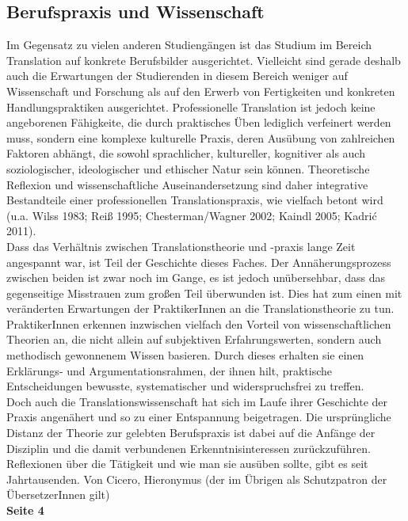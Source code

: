 \documentclass{article}
\begin{document}
	\subsection*{Berufspraxis und Wissenschaft}
	Im Gegensatz zu vielen anderen Studiengängen ist das Studium im Bereich Translation auf konkrete Berufsbilder ausgerichtet. Vielleicht sind gerade deshalb auch die Erwartungen der Studierenden in diesem Bereich weniger auf Wissenschaft und Forschung als auf den Erwerb von Fertigkeiten und konkreten Handlungspraktiken ausgerichtet. Professionelle Translation ist jedoch keine angeborenen Fähigkeite, die durch praktisches Üben lediglich verfeinert werden muss, sondern eine komplexe kulturelle Praxis, deren Ausübung von zahlreichen Faktoren abhängt, die sowohl sprachlicher, kultureller, kognitiver als auch soziologischer, ideologischer und ethischer Natur sein können. Theoretische Reflexion und wissenschaftliche Auseinandersetzung sind daher integrative Bestandteile einer professionellen Translationspraxis, wie vielfach betont wird (u.a. Wilss 1983; Reiß 1995; Chesterman/Wagner 2002; Kaindl 2005; Kadrić 2011). \\
	Dass das Verhältnis zwischen Translationstheorie und -praxis lange Zeit angespannt war, ist Teil der Geschichte dieses Faches. Der Annäherungsprozess zwischen beiden ist zwar noch im Gange, es ist jedoch unübersehbar, dass das gegenseitige Misstrauen zum großen Teil überwunden ist. Dies hat zum einen mit veränderten Erwartungen der PraktikerInnen an die Translationstheorie zu tun. PraktikerInnen erkennen inzwischen vielfach den Vorteil von wissenschaftlichen Theorien an, die nicht allein auf subjektiven Erfahrungswerten, sondern auch methodisch gewonnenem Wissen basieren. Durch dieses erhalten sie einen Erklärungs- und Argumentationsrahmen, der ihnen hilt, praktische Entscheidungen bewusste, systematischer und widerspruchsfrei zu treffen. \\
	Doch auch die Translationswissenschaft hat sich im Laufe ihrer Geschichte der Praxis angenähert und so zu einer Entspannung beigetragen. Die ursprüngliche Distanz der Theorie zur gelebten Berufspraxis ist dabei auf die Anfänge der Disziplin und die damit verbundenen Erkenntnisinteressen zurückzuführen. \\
	Reflexionen über die Tätigkeit und wie man sie ausüben sollte, gibt es seit Jahrtausenden. Von Cicero, Hieronymus (der im Übrigen als Schutzpatron der ÜbersetzerInnen gilt) \\
	\textbf{Seite 4} \\
\end{document}
